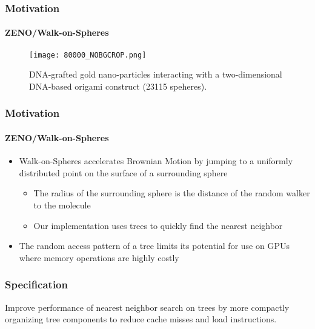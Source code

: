
\begin{frame}
  \frametitle{Motivation}
  \framesubtitle{ZENO/Walk-on-Spheres}

  \begin{figure}
    \centering
    \texttt{[image: 80000\_NOBGCROP.png]}
    \caption{DNA-grafted gold nano-particles interacting with a 
    two-dimensional DNA-based origami construct (23115 speheres).}
    \label{fig:80000}
  \end{figure}
\end{frame}

\begin{frame}
  \frametitle{Motivation}
  \framesubtitle{ZENO/Walk-on-Spheres}

  \begin{itemize}
    \item Walk-on-Spheres accelerates Brownian Motion by jumping to a uniformly distributed point on the surface
      of a surrounding sphere
      \begin{itemize}
        \item The radius of the surrounding sphere is the distance of the random walker to the molecule
        \item Our implementation uses \kd trees to quickly find the nearest neighbor
      \end{itemize}
    \item The random access pattern of a \kd tree limits its potential for use on GPUs where memory operations
      are highly costly
  \end{itemize}

\end{frame}

\begin{frame}
  \frametitle{Specification}

  {\color{white}
  Improve performance of nearest neighbor search on \kd trees by more compactly organizing tree components
  to reduce cache misses and load instructions.}

\end{frame}
